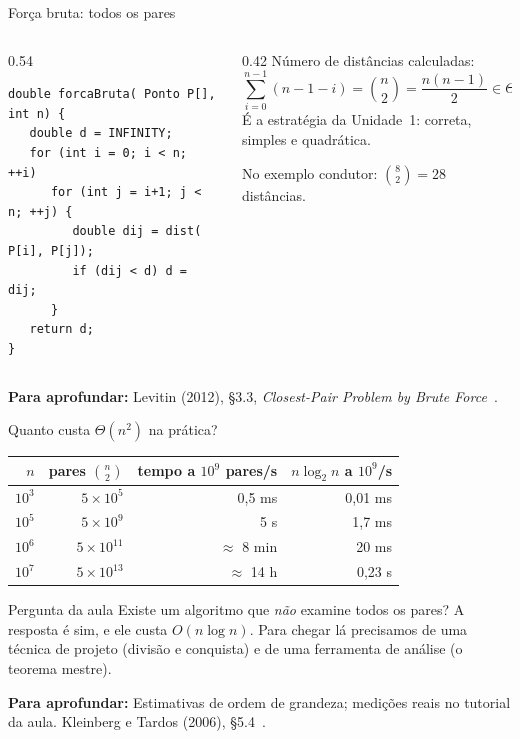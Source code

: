 \documentclass[aspectratio=169,xcolor=table]{beamer}
\newcommand{\fonte}[1]{%
  \vfill
  {\tiny\color{gray!55!black}\textbf{Para aprofundar:} #1\par}%
}
\begin{document}
\begin{frame}[fragile]{Força bruta: todos os pares}
  \begin{columns}[T]
    \begin{column}{0.54\textwidth}
\begin{lstlisting}
double forcaBruta( Ponto P[], int n) {
   double d = INFINITY;
   for (int i = 0; i < n; ++i)
      for (int j = i+1; j < n; ++j) {
         double dij = dist( P[i], P[j]);
         if (dij < d) d = dij;
      }
   return d;
}
\end{lstlisting}
    \end{column}
    \begin{column}{0.42\textwidth}
      \scriptsize
      Número de distâncias calculadas:
      \[
        \sum_{i=0}^{n-1}(n-1-i)=\binom{n}{2}=\frac{n(n-1)}{2}\in\Theta(n^2).
      \]
      É a estratégia da Unidade~1: correta, simples e quadrática.

      \smallskip
      No exemplo condutor: $\binom{8}{2}=28$ distâncias.
    \end{column}
  \end{columns}
  \fonte{Levitin (2012), \S 3.3, \emph{Closest-Pair Problem by Brute Force}~\cite{levitin2012introduction}.}
\end{frame}

\begin{frame}{Quanto custa $\Theta(n^2)$ na prática?}
  \begin{center}
  \scriptsize
  \begin{tabular}{rrrr}
    \toprule
    $n$ & pares $\binom{n}{2}$ & tempo a $10^9$ pares/s & $n\log_2 n$ a $10^9$/s \\
    \midrule
    $10^3$ & $5\times 10^5$    & 0{,}5 ms     & 0{,}01 ms \\
    $10^5$ & $5\times 10^9$    & 5 s          & 1{,}7 ms  \\
    $10^6$ & $5\times 10^{11}$ & $\approx$ 8 min  & 20 ms \\
    $10^7$ & $5\times 10^{13}$ & $\approx$ 14 h   & 0{,}23 s \\
    \bottomrule
  \end{tabular}
  \end{center}
  \begin{alertblock}{Pergunta da aula}
    \scriptsize Existe um algoritmo que \emph{não} examine todos os pares?
    A resposta é sim, e ele custa $O(n\log n)$. Para chegar lá precisamos
    de uma técnica de projeto (divisão e conquista) e de uma ferramenta de
    análise (o teorema mestre).
  \end{alertblock}
  \fonte{Estimativas de ordem de grandeza; medições reais no tutorial da aula.
    Kleinberg e Tardos (2006), \S 5.4~\cite{kleinberg2006algorithm}.}
\end{frame}
\end{document}
